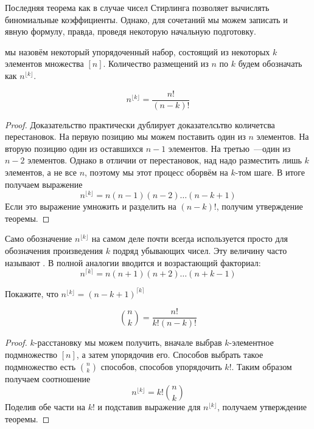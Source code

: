 Последняя теорема как в случае чисел Стирлинга позволяет вычислять биномиальные коэффициенты. Однако, для сочетаний мы можем записать и явную формулу, правда, проведя некоторую начальную подготовку.

\begin{definition}
 мы назовём некоторый упорядоченный набор, состоящий из некоторых $k$ элементов множества $[n]$. Количество размещений из $n$ по $k$ будем обозначать как $n^{\lfloor k\rfloor}$.
\end{definition}

\begin{thm}
$$n^{\lfloor k \rfloor} = \frac{n!}{(n-k)!}$$
\end{thm}
\begin{proof}
Доказательство практически дублирует доказателсьтво количетсва перестановок. На первую позицию мы можем поставить один из $n$ элементов. На вторую позицию один из оставшихся $n-1$ элементов. На третью~---один из $n-2$ элементов. Однако в отличии от перестановок, над надо разместить лишь $k$ элементов, а не все $n$, поэтому мы этот процесс оборвём на $k$-том шаге. В итоге получаем выражение
$$n^{\lfloor k \rfloor} = n (n-1)  (n-2) \ldots (n-k+1)$$
Если это выражение умножить и разделить на $(n-k)!$, получим утверждение теоремы.
\end{proof}

Само обозначение $n^{\lfloor k \rfloor}$ на самом деле почти всегда используется просто для обозначения произведения $k$ подряд убывающих чисел. Эту величину часто называют . В полной аналогии вводится и возрастающий факториал:
$$n^{\lceil k \rceil} = n(n+1)(n+2)\ldots(n+k-1)$$

\begin{exercise}
Покажите, что $n^{\lfloor k \rfloor} = (n-k+1)^{\lceil k \rceil}$
\end{exercise}

\begin{thm}
$${n \choose k} = \frac{n!}{k!(n-k)!}$$
\end{thm}
\begin{proof}
$k$-расстановку мы можем получить, вначале выбрав $k$-элементное подмножество $[n]$, а затем упорядочив его. Способов выбрать такое подмножество есть $n\choose k$ способов, способов упорядочить $k!$. Таким образом получаем соотношение
$$n^{\lfloor k \rfloor} = k!{n\choose k}$$
Поделив обе части на $k!$ и подставив выражение для $n^{\lfloor k \rfloor}$, получаем утверждение теоремы.
\end{proof}

